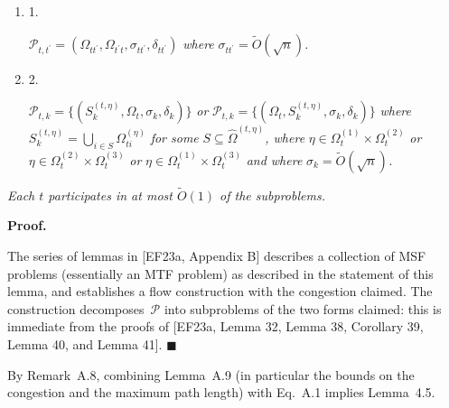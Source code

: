 \documentclass[10pt,a4paper]{article}
\begin{document}
\begin{enumerate}


\item[] 1. 


$\mathcal{P}_{t,t^{\prime}}=(\Omega_{tt^{\prime}},\Omega_{t^{\prime}t},\sigma_{tt^{\prime}},\delta_{tt^{\prime}})$\emph{ where }$\sigma_{tt^{\prime}}=\widetilde{O}(\sqrt{n})$\emph{.}\par




\item[] 2. 


$\mathcal{P}_{t,k}=\{(S_{k}^{(t,\eta)},\Omega_{t},\sigma_{k},\delta_{k})\}$\emph{ or }$\mathcal{P}_{t,k}=\{(\Omega_{t},S_{k}^{(t,\eta)},\sigma_{k},\delta_{k})\}$\emph{ where }$S_{k}^{(t,\eta)}=\bigcup_{i\in S}\Omega_{ti}^{(\eta)}$\emph{ for some }$S\subseteq\hat{\Omega}^{(t,\eta)}$\emph{, where }$\eta\in\Omega_{t}^{(1)}\times\Omega_{t}^{(2)}$\emph{ or }$\eta\in\Omega_{t}^{(2)}\times\Omega_{t}^{(3)}$\emph{ or }$\eta\in\Omega_{t}^{(1)}\times\Omega_{t}^{(3)}$\emph{ and where }$\sigma_{k}=\widetilde{O}(\sqrt{n})$\emph{.}\par




\end{enumerate}


\emph{Each $t$ participates in at most $\widetilde{O}(1)$ of the subproblems.}\par






\par\medskip\noindent\textbf{Proof.}\par



The series of lemmas in [EF23a, Appendix B] describes a collection of MSF problems (essentially an MTF problem) as described in the statement of this lemma, and establishes a flow construction with the congestion claimed. The construction decomposes $\mathcal{P}$ into subproblems of the two forms claimed: this is immediate from the proofs of [EF23a, Lemma 32, Lemma 38, Corollary 39, Lemma 40, and Lemma 41].
\ensuremath{\blacksquare}\par





By Remark A.8, combining Lemma A.9 (in particular the bounds on the congestion and the maximum path length) with Eq. A.1 implies Lemma 4.5.\par
\end{document}
